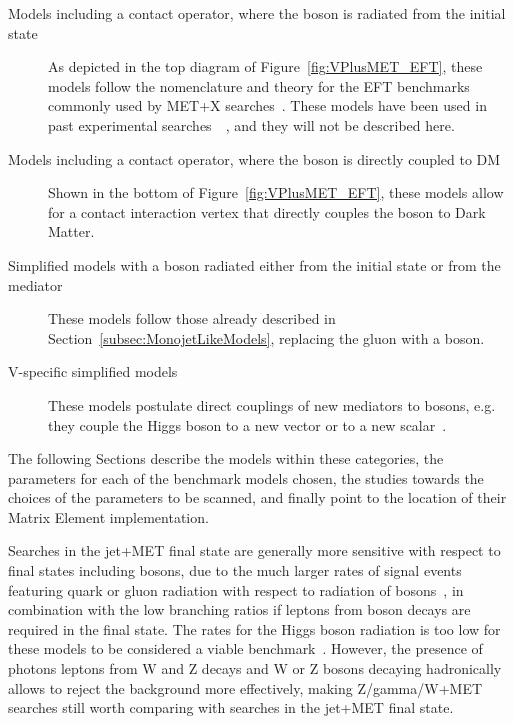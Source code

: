 \begin{description}
 \item[Models including a contact operator, where the boson is radiated from the initial state] As depicted in
 the top diagram of Figure~\ref{fig:VPlusMET_EFT}, these models follow the nomenclature and theory
 for the EFT benchmarks commonly used by MET+X searches~\cite{Goodman:2010ku}. These models
 have been used in past experimental searches~~\cite{Khachatryan:2014rwa, Aad:2014vka,Khachatryan:2014tva, Aad:2014vka,
 ATLAS:2014wra, Aad:2013oja}, and they will not be described here.
 \item[Models including a contact operator, where the boson is directly coupled to DM]
 Shown in the bottom of Figure~\ref{fig:VPlusMET_EFT},
 these models allow for a contact interaction vertex that directly couples the boson to Dark Matter.
 \item[Simplified models with a boson radiated either from the initial state or from the mediator] These models follow those
 already described in Section~\ref{subsec:MonojetLikeModels}, replacing the gluon with a boson.
 \item[V-specific simplified models] These models postulate direct couplings of new mediators
 to bosons, e.g. they couple the Higgs boson to a new vector or to a new scalar~\cite{Carpenter:2013xra,Berlin:2014cfa}. 
\end{description}

The following Sections describe the models within these categories,
the parameters for each of the benchmark models chosen,
the studies towards the choices of the parameters to be scanned,
and finally point to the location of their Matrix Element
implementation.


Searches in the jet+MET final state are generally more sensitive
with respect to final states including bosons, due to the much
larger rates of signal events featuring quark or gluon radiation with
respect to radiation of bosons~\cite{Zhou:2013fla},
in combination with the low branching ratios if leptons from
boson decays are required in the final state.
The rates for the Higgs boson radiation is too low for these models
to be considered a viable benchmark~\cite{Carpenter:2013xra}.
However, the presence of photons
leptons from W and Z decays
and W or Z bosons decaying hadronically
allows to reject the background more effectively, making Z/gamma/W+MET searches
still worth comparing with searches in the jet+MET final state.


